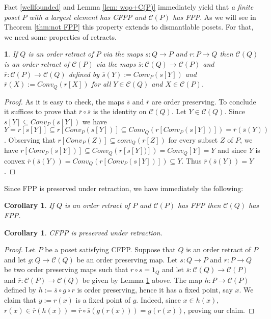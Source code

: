\documentclass[12pt]{amsart}
\newtheorem{corollary}[definition]{{\bf Corollary}}
\newtheorem{lemma}[definition]{\noindent {\bf Lemma}}
\begin{document}
Fact \ref {wellfounded} and Lemma \ref {lem: wqo+C(P)} immediately
yield that \emph{a finite poset $P$ with a largest element has CFPP and
$\mathcal C (P)$ has FPP}. As we will see in Theorem \ref{thm:not
FPP} this property extends to dismantlable posets.  For that, we need
some properties of retracts.

\begin{lemma}\label{lem:C(P)retraction} 
If $Q$ is an order retract of $P$ via the maps $s: Q \rightarrow P$
and $r:P\rightarrow Q$ then $\mathcal C (Q)$ is an order retract of
$\mathcal C (P)$ via the maps $\overline s: \mathcal C (Q) \rightarrow
\mathcal C (P)$ and $\overline r:\mathcal C (P)\rightarrow \mathcal C
(Q)$ defined by $\overline s(Y):= Conv_P(s[Y])$ and $\overline r(X):=
Conv_Q(r[X])$ for all $Y \in \mathcal C (Q)$ and $X\in \mathcal C (P)$.
\end{lemma}

\begin{proof} 
As it is easy to check, the maps $\overline s$ and $\overline r$ are
order preserving. To conclude it suffices to prove that $\overline
r\circ \overline s$ is the identity on $\mathcal C (Q)$. Let $Y\in
\mathcal C (Q)$. Since $s[Y]\subseteq Conv_P(s[Y])$ we have
$Y=r[s[Y]] \subseteq r[Conv_P(s[Y])] \subseteq Conv_Q(r[Conv_P(s[Y])])
= \overline r(\overline s(Y))$. Observing that $r[Conv_P(Z)] \subseteq
conv_Q(r[Z])$ for every subset $Z$ of $P$, we have $r[Conv_P(s[Y])]
\subseteq Conv_Q(r[s[Y])]) = Conv_Q[Y] = Y$ and since $Y$ is convex
$\overline r(\overline s(Y)) = Conv_Q(r[Conv_P(s[Y])]) \subseteq
Y$. Thus $\overline r(\overline s(Y)) = Y$.
\end{proof}

\vspace{.3cm}

Since FPP is preserved under retraction, we have immediately the following: 

\begin{corollary}\label{lem:FPPretraction} 
If $Q$ is an order retract of $P$ and $\mathcal C (P)$ has FPP then
$\mathcal C (Q)$ has FPP.
\end{corollary}

\begin{corollary}\label{lem:CFPPretraction} 
CFPP is preserved under retraction.
\end{corollary}

\begin{proof}
Let $P$ be a poset satisfying CFPP. Suppose that $Q$ is an order
retract of $P$ and let $g: Q \rightarrow \mathcal C (Q)$ be an
order preserving map. Let $s: Q \rightarrow P$ and $r:P\rightarrow Q$
be two order preserving maps such that $r\circ s =1_{Q}$ and let
$\overline s: \mathcal C (Q) \rightarrow \mathcal C (P)$ and
$\overline r:\mathcal C (P)\rightarrow \mathcal C (Q)$ be given
by Lemma \ref {lem:C(P)retraction} above.  The map $h: P\rightarrow
\mathcal C (P)$ defined by $h:= \overline s\circ g\circ r $ is
order preserving, hence it has a fixed point, say $x$.  We claim that
$y:=r(x)$ is a fixed point of $g$.  Indeed, since $x\in h(x)$,
$r(x)\in \overline r(h(x))= \overline r\circ \overline s(g(r(x)))=
g(r(x))$, proving our claim.
\end{proof}
 
\end{document}

